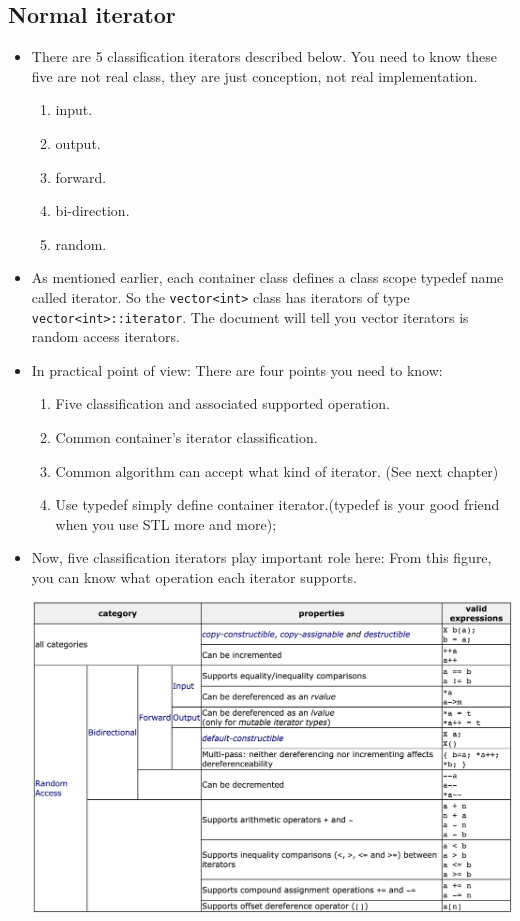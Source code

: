 \documentclass[a4paper,11pt,twoside]{book}
\begin{document}
\subsection{Normal iterator}
\begin{itemize}
\item There are 5 classification iterators described below. You need to know these five are not real class, they are just conception, not real implementation.
\begin{enumerate}
	\item input.
	\item output.
	\item forward.
	\item bi-direction.
	\item random.
\end{enumerate}
 
\item As mentioned earlier, each container class defines a class scope typedef name called iterator. So the \texttt{vector<int>} class has iterators of type \texttt{vector<int>::iterator}.  The document will tell you vector iterators is random access iterators.

 \item In practical point of view: There are four points you need to know:
\begin{enumerate}
\item Five classification and associated supported operation.
\item Common container's iterator classification.
\item Common algorithm can accept what kind of iterator. (See next chapter)
\item Use typedef simply define container iterator.(typedef is your good friend when you use STL more and more);
\end{enumerate}

\item Now, five classification iterators play important role here: From this figure, you can know what operation each iterator supports.  \newline
\begin{center}
	  \includegraphics[scale=0.48]{pics/iterator.png}
\end{center}



\end{itemize}
\end{document}
